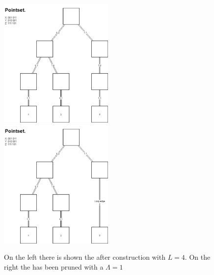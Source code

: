 \begin{figure}
	\includegraphics[width=0.5\textwidth]{figures/quadtree}
	\includegraphics[width=0.5\textwidth]{figures/prunnedquadtree}
	\caption{On the left there is shown the \qt{} after construction with $L=4$. On the right the \qt{} has been pruned with a $\Lambda = 1$}
	\label{fig:quadtree}
\end{figure}

